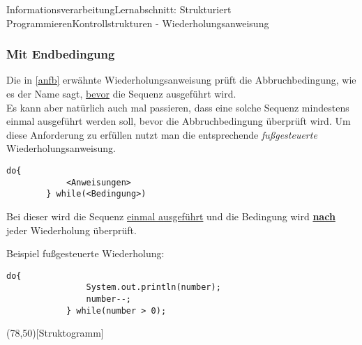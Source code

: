 \documentclass[11pt,oneside,openany,headings=optiontotoc,11pt,numbers=noenddot]{article}
\begin{document}
\begin{worksheet}{Informationsverarbeitung}{Lernabschnitt: Strukturiert Programmieren}{Kontrollstrukturen - Wiederholungsanweisung}
		\subsubsection{Mit Endbedingung}
		Die in \ref{anfb} erwähnte Wiederholungsanweisung prüft die Abbruchbedingung, wie es der Name sagt, \underline{bevor} die Sequenz ausgeführt wird.\\
		Es kann aber natürlich auch mal passieren, dass eine solche Sequenz mindestens einmal ausgeführt werden soll, bevor die Abbruchbedingung überprüft wird. Um diese Anforderung zu erfüllen nutzt man die entsprechende \textit{fußgesteuerte} Wiederholungsanweisung.
		\begin{lstlisting}[style=JavaInputStyle]
		do{
			<Anweisungen>
		} while(<Bedingung>)
		\end{lstlisting}
		\par\noindent
		Bei dieser wird die Sequenz \underline{einmal ausgeführt} und die Bedingung wird \textbf{\underline{nach}} jeder Wiederholung überprüft.
		\par\noindent
		\begin{minipage}[t]{0.48\textwidth}
			\vspace*{0pt}
			Beispiel fußgesteuerte Wiederholung:
			\begin{lstlisting}[style=JavaInputStyle,frame=single]
			do{
				System.out.println(number);
				number--;
			} while(number > 0);
			\end{lstlisting}
		\end{minipage}
		\hfill
		\begin{minipage}[t]{0.48\textwidth}
			\vspace*{0pt}
			\begin{struktogramm}(78,50)[Struktogramm]
				\untilend
			\end{struktogramm}
		\end{minipage}
	\end{worksheet}
\end{document}
